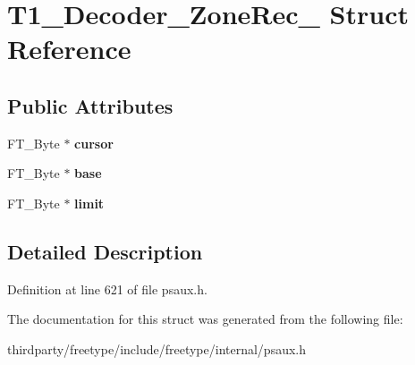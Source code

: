\hypertarget{struct_t1___decoder___zone_rec__}{}\section{T1\+\_\+\+Decoder\+\_\+\+Zone\+Rec\+\_\+ Struct Reference}
\label{struct_t1___decoder___zone_rec__}
\subsection*{Public Attributes}
\begin{DoxyCompactItemize}
\item 
\mbox{\label{struct_t1___decoder___zone_rec___a14e9f190496672f6174ead91e375767d}} 
F\+T\+\_\+\+Byte $\ast$ {\bfseries cursor}
\item 
\mbox{\label{struct_t1___decoder___zone_rec___a9cd7e54387b238504b1e8aae47b7da7c}} 
F\+T\+\_\+\+Byte $\ast$ {\bfseries base}
\item 
\mbox{\label{struct_t1___decoder___zone_rec___a46fe1e4aa9bdb712ae414305f88d95db}} 
F\+T\+\_\+\+Byte $\ast$ {\bfseries limit}
\end{DoxyCompactItemize}


\subsection{Detailed Description}


Definition at line 621 of file psaux.\+h.



The documentation for this struct was generated from the following file\+:\begin{DoxyCompactItemize}
\item 
thirdparty/freetype/include/freetype/internal/psaux.\+h\end{DoxyCompactItemize}
